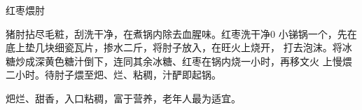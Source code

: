 \begin{recipe}{红枣煨肘}

\ingredients


\preparation

\step 猪肘拈尽毛粧，刮洗干净，在煮锅内除去血腥味。红枣洗干净0
\step 小锑锅一个，先在底上垫几块细瓷瓦片，掺水二斤，将肘子放入，在旺火上烧开，
打去泡沫。将冰糖炒成深黄色糖汁倒下，连同其余冰糖、红枣在锅内烧一小时，再移文火
上慢煨二小时。待肘子煨至𤆵、烂、粘稠，汁酽即起锅。

\features

𤆵烂、甜香，入口粘稠，富于营养，老年人最为适宜。

\end{recipe}

